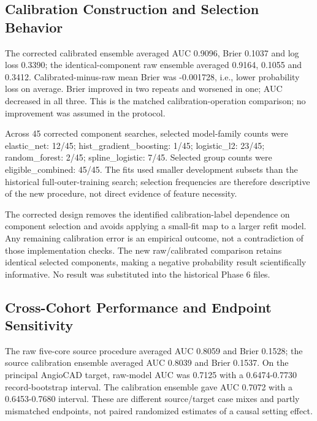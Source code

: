 \documentclass[conference]{IEEEtran}
\begin{document}
\subsection{Calibration Construction and Selection Behavior}
The corrected calibrated ensemble averaged AUC 0.9096, Brier 0.1037 and log loss 0.3390; the identical-component raw ensemble averaged 0.9164, 0.1055 and 0.3412. Calibrated-minus-raw mean Brier was -0.001728, i.e., lower probability loss on average. Brier improved in two repeats and worsened in one; AUC decreased in all three. This is the matched calibration-operation comparison; no improvement was assumed in the protocol.

Across 45 corrected component searches, selected model-family counts were elastic\_net: 12/45; hist\_gradient\_boosting: 1/45; logistic\_l2: 23/45; random\_forest: 2/45; spline\_logistic: 7/45. Selected group counts were eligible\_combined: 45/45. The fits used smaller development subsets than the historical full-outer-training search; selection frequencies are therefore descriptive of the new procedure, not direct evidence of feature necessity.

The corrected design removes the identified calibration-label dependence on component selection and avoids applying a small-fit map to a larger refit model. Any remaining calibration error is an empirical outcome, not a contradiction of those implementation checks. The new raw/calibrated comparison retains identical selected components, making a negative probability result scientifically informative. No result was substituted into the historical Phase 6 files.

\subsection{Cross-Cohort Performance and Endpoint Sensitivity}
The raw five-core source procedure averaged AUC 0.8059 and Brier 0.1528; the source calibration ensemble averaged AUC 0.8039 and Brier 0.1537. On the principal AngioCAD target, raw-model AUC was 0.7125 with a 0.6474-0.7730 record-bootstrap interval. The calibration ensemble gave AUC 0.7072 with a 0.6453-0.7680 interval. These are different source/target case mixes and partly mismatched endpoints, not paired randomized estimates of a causal setting effect.
\end{document}
